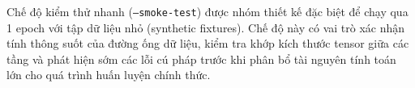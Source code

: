 Chế độ kiểm thử nhanh (\texttt{--smoke-test}) được nhóm thiết kế đặc biệt để chạy qua 1 epoch với tập dữ liệu nhỏ (synthetic fixtures). Chế độ này có vai trò xác nhận tính thông suốt của đường ống dữ liệu, kiểm tra khớp kích thước tensor giữa các tầng và phát hiện sớm các lỗi cú pháp trước khi phân bổ tài nguyên tính toán lớn cho quá trình huấn luyện chính thức.
